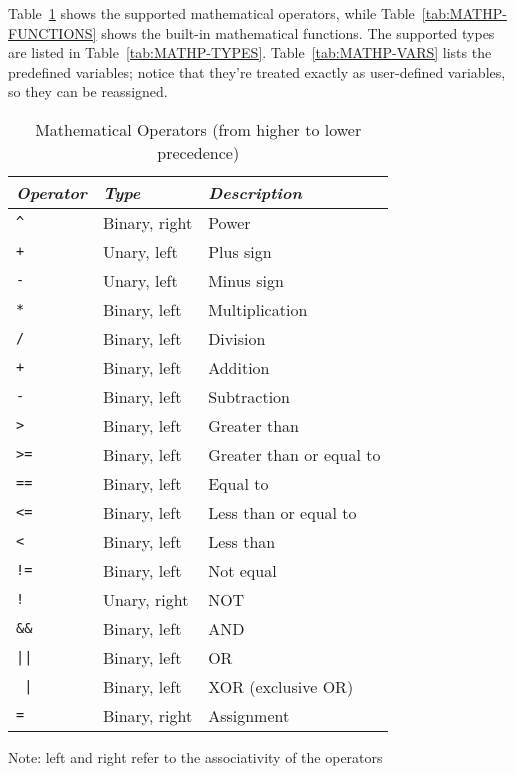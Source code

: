 \noindent
Table~\ref{tab:MATHP-OPERATORS} shows the supported mathematical 
operators, while Table~\ref{tab:MATHP-FUNCTIONS} shows the built-in
mathematical functions.
The supported types are listed in Table~\ref{tab:MATHP-TYPES}.
Table~\ref{tab:MATHP-VARS} lists the predefined variables; notice
that they're treated exactly as user-defined variables, so they 
can be reassigned.

\begin{table}
	\begin{center}
	\caption{Mathematical Operators 
	(from higher to lower precedence)}\label{tab:MATHP-OPERATORS}
	\begin{tabular}{lll}
		\hline
		\emph{Operator} & \emph{Type} & \emph{Description} \\
		\hline
		\texttt{\^} & Binary, right & Power \\
		\texttt{+} & Unary, left & Plus sign \\
		\texttt{-} & Unary, left & Minus sign \\
		\texttt{*} & Binary, left & Multiplication \\
		\texttt{/} & Binary, left & Division \\
		\texttt{+} & Binary, left & Addition \\
		\texttt{-} & Binary, left & Subtraction \\
		\texttt{>} & Binary, left & Greater than \\
		\texttt{>=} & Binary, left & Greater than or equal to \\
		\texttt{==} & Binary, left & Equal to \\
		\texttt{<=} & Binary, left & Less than or equal to \\
		\texttt{<} & Binary, left & Less than \\
		\texttt{!=} & Binary, left & Not equal \\
		\texttt{!} & Unary, right & NOT \\
		\texttt{\&\&} & Binary, left & AND \\
		\texttt{||} & Binary, left & OR \\
		\texttt{{~}|} & Binary, left & XOR (exclusive OR) \\
		\texttt{=} & Binary, right & Assignment \\
		\hline
	\end{tabular}
	\end{center}
	\small
	Note: left and right refer to the associativity of the operators
\end{table}

